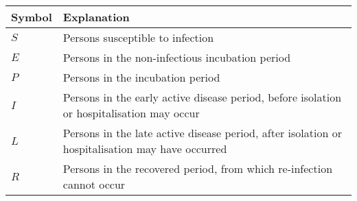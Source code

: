 \begin{table}[ht]
\renewcommand{\baselinestretch}{1}
    	\begin{tabular}{| p{2cm} | p{11.1cm} |}
    	\hline
    		Symbol & Explanation \\
	    	\hline
	    	$S$ & Persons susceptible to infection \\
    		$E$ & Persons in the non-infectious incubation period \\
    		$P$ & Persons in the incubation period \\
    		$I$ & Persons in the early active disease period, before isolation or hospitalisation may occur \\
    		$L$ & Persons in the late active disease period, after isolation or hospitalisation may have occurred \\
    		$R$ & Persons in the recovered period, from which re-infection cannot occur \\
    		\hline
	\end{tabular}
\end{table}


